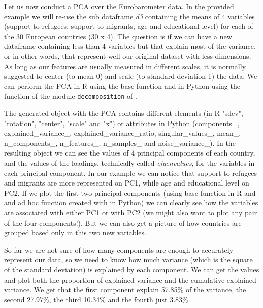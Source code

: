 Let us now conduct a PCA over the Eurobarometer data.  In the provided example we will re-use the sub dataframe \emph{d3} containing the means of 4 variables (support to refugees, support to migrants, age and educational level) for each of the 30 European countries (30 x 4). The question is if we can have a new dataframe containing less than 4 variables but that explain most of the variance, or in other words, that represent well our original dataset with less dimensions. As long as our features are usually measured in different scales, it is normally suggested to center (to mean 0) and scale (to standard deviation 1) the data. We can perform the PCA in R using the base function  and in Python using the function  of the module \texttt{decomposition} of . 


The generated object with the PCA contains different elements (in R "sdev",     "rotation", "center",  "scale" and   "x") or attributes in Python (components\_, explained\_variance\_, explained\_variance\_ratio, singular\_values\_, mean\_, n\_components\_, n\_features\_, n\_samples\_ and noise\_variance\_). In the resulting object we can see the values of 4 principal components of each country, and the values of the loadings, technically called \textit{eigenvalues}, for the variables in each principal component. In our example we can notice that support to refugees and migrants are more represented on PC1, while age and educational level on PC2. If we plot the first two principal components (using base function  in R and and ad hoc function created with  in Python) we can clearly see how the variables are associated with either PC1 or with PC2 (we might also want to plot any pair of the four components!). But we can also get a picture of how countries are grouped based only in this two new variables.


So far we are not sure of how many components are enough to accurately represent our data, so we need to know how much variance (which is the square of the standard deviation) is explained by each component. We can get the values and plot both the proportion of explained variance and the cumulative explained variance. We get that the first component explain 57.85\% of the variance, the second 27.97\%, the third 10.34\% and the fourth just 3.83\%. 


